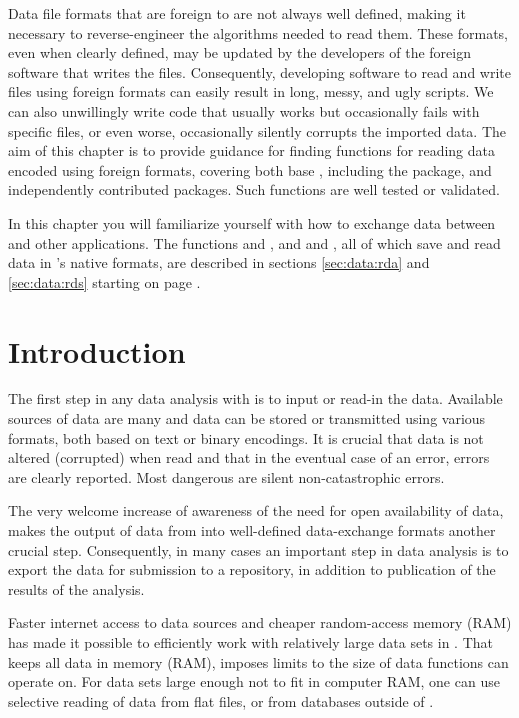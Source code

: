 \documentclass[krantz2]{krantz}\usepackage{knitr}
\begin{document}
Data file formats that are foreign to \Rlang are not always well defined, making it necessary to reverse-engineer the algorithms needed to read them. These formats, even when clearly defined, may be updated by the developers of the foreign software that writes the files. Consequently, developing software to read and write files using foreign formats can easily result in long, messy, and ugly \Rlang scripts. We can also unwillingly write code that usually works but occasionally fails with specific files, or even worse, occasionally silently corrupts the imported data. The aim of this chapter is to provide guidance for finding functions for reading data encoded using foreign formats, covering both base \Rlang, including the  package, and independently contributed packages. Such functions are well tested or validated.

In this chapter you will familiarize yourself with how to exchange data between \Rlang and other applications. The functions  and , and  and  , all of which save and read data in \Rlang's native formats, are described in sections \ref{sec:data:rda} and \ref{sec:data:rds} starting on page \pageref{sec:data:rda}.

\section{Introduction}

The first step in any data analysis with \Rlang is to input or read-in the data. Available sources of data are many and data can be stored or transmitted using various formats, both based on text or binary encodings. It is crucial that data is not altered (corrupted) when read and that in the eventual case of an error, errors are clearly reported. Most dangerous are silent non-catastrophic errors.

The very welcome increase of awareness of the need for open availability of data, makes the output of data from \Rlang into well-defined data-exchange formats another crucial step. Consequently, in many cases an important step in data analysis is to export the data for submission to a repository, in addition to publication of the results of the analysis.

Faster internet access to data sources and cheaper random-access memory (RAM) has made it possible to efficiently work with relatively large data sets in \Rlang. That \Rlang keeps all data in memory (RAM), imposes limits to the size of data \Rlang functions can operate on. For data sets large enough not to fit in computer RAM, one can use selective reading of data from flat files, or from databases outside of \Rlang.
\end{document}
